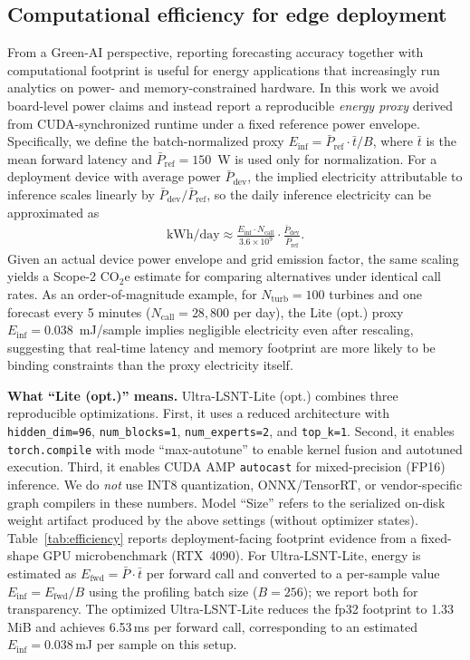 \documentclass[review,3p,times]{elsarticle}
\begin{document}
\subsection{Computational efficiency for edge deployment}
\label{subsec:results_efficiency}
From a Green-AI perspective, reporting forecasting accuracy together with computational footprint is useful for energy applications that increasingly run analytics on power- and memory-constrained hardware. In this work we avoid board-level power claims and instead report a reproducible \emph{energy proxy} derived from CUDA-synchronized runtime under a fixed reference power envelope. Specifically, we define the batch-normalized proxy $E_{\text{inf}}=\bar{P}_{\text{ref}}\cdot\bar{t}/B$, where $\bar{t}$ is the mean forward latency and $\bar{P}_{\text{ref}}=150$~W is used only for normalization. For a deployment device with average power $\bar{P}_{\text{dev}}$, the implied electricity attributable to inference scales linearly by $\bar{P}_{\text{dev}}/\bar{P}_{\text{ref}}$, so the daily inference electricity can be approximated as
\begin{align}
\text{kWh/day} \approx \frac{E_{\text{inf}} \cdot N_{\text{call}}}{3.6\times 10^{9}}\cdot\frac{\bar{P}_{\text{dev}}}{\bar{P}_{\text{ref}}}.
\end{align}
Given an actual device power envelope and grid emission factor, the same scaling yields a Scope-2 CO$_2$e estimate for comparing alternatives under identical call rates. As an order-of-magnitude example, for $N_{\text{turb}}=100$ turbines and one forecast every 5 minutes ($N_{\text{call}}=28{,}800$ per day), the Lite (opt.) proxy $E_{\text{inf}}=0.038$~mJ/sample implies negligible electricity even after rescaling, suggesting that real-time latency and memory footprint are more likely to be binding constraints than the proxy electricity itself.

\textbf{What ``Lite (opt.)'' means.} Ultra-LSNT-Lite (opt.) combines three reproducible optimizations. First, it uses a reduced architecture with \texttt{hidden\_dim=96}, \texttt{num\_blocks=1}, \texttt{num\_experts=2}, and \texttt{top\_k=1}. Second, it enables \texttt{torch.compile} with mode ``max-autotune'' to enable kernel fusion and autotuned execution. Third, it enables CUDA AMP \texttt{autocast} for mixed-precision (FP16) inference. We do \emph{not} use INT8 quantization, ONNX/TensorRT, or vendor-specific graph compilers in these numbers. Model ``Size'' refers to the serialized on-disk weight artifact produced by the above settings (without optimizer states).
Table~\ref{tab:efficiency} reports deployment-facing footprint evidence from a fixed-shape GPU microbenchmark (RTX~4090). For Ultra-LSNT-Lite, energy is estimated as $E_{\text{fwd}}=\bar{P}\cdot\bar{t}$ per forward call and converted to a per-sample value $E_{\text{inf}}=E_{\text{fwd}}/B$ using the profiling batch size ($B=256$); we report both for transparency. The optimized Ultra-LSNT-Lite reduces the fp32 footprint to 1.33\,MiB and achieves 6.53\,ms per forward call, corresponding to an estimated $E_{\text{inf}}=0.038$\,mJ per sample on this setup.
\end{document}
